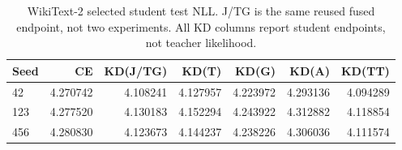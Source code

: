 \begingroup\small
\setlength{\tabcolsep}{5pt}
\begin{table}[htbp]\centering
\begin{tabular}{lrrrrrr}
\toprule
Seed & CE & KD(J/TG) & KD(T) & KD(G) & KD(A) & KD(TT) \\
\midrule
42 & 4.270742 & 4.108241 & 4.127957 & 4.223972 & 4.293136 & 4.094289 \\
123 & 4.277520 & 4.130183 & 4.152294 & 4.243922 & 4.312882 & 4.118854 \\
456 & 4.280830 & 4.123673 & 4.144237 & 4.238226 & 4.306036 & 4.111574 \\
\bottomrule
\end{tabular}
\caption{WikiText-2 selected student test NLL. J/TG is the same reused fused endpoint, not two experiments. All KD columns report student endpoints, not teacher likelihood.}\label{tab:wt2_endpoints}
\end{table}
\endgroup
